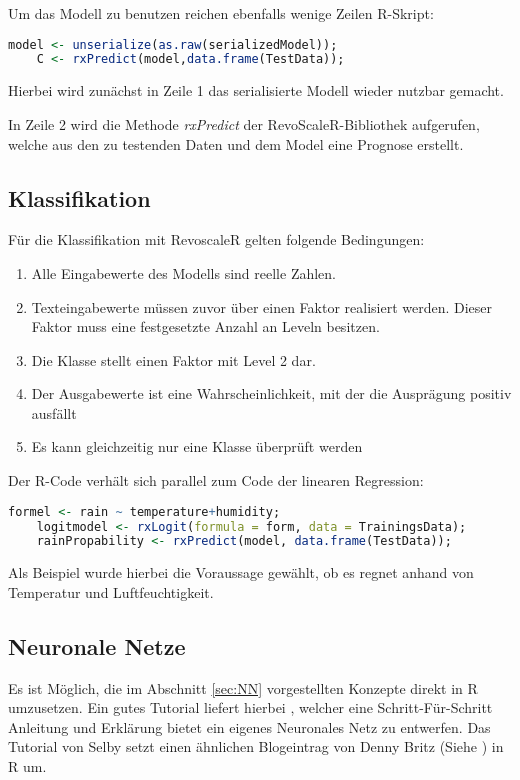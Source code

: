 Um das Modell zu benutzen reichen ebenfalls wenige Zeilen R-Skript: \newline

\begin{lstlisting}[language=R]
	model <- unserialize(as.raw(serializedModel)); 
	C <- rxPredict(model,data.frame(TestData));
\end{lstlisting}

Hierbei wird zunächst in Zeile 1 das serialisierte Modell wieder nutzbar gemacht. 

In Zeile 2 wird die Methode \textit{rxPredict} der RevoScaleR-Bibliothek aufgerufen, welche aus den zu testenden Daten und dem Model eine Prognose erstellt. 
\subsection{Klassifikation}
Für die Klassifikation mit RevoscaleR gelten folgende Bedingungen: ~\newline

\begin{enumerate}
	\item Alle Eingabewerte des Modells sind reelle Zahlen.
	\item Texteingabewerte müssen zuvor über einen Faktor realisiert werden. Dieser Faktor muss eine festgesetzte Anzahl an Leveln besitzen.
	\item Die Klasse stellt einen Faktor mit Level 2 dar.
	\item Der Ausgabewerte ist eine Wahrscheinlichkeit, mit der die Ausprägung positiv ausfällt
	\item Es kann gleichzeitig nur eine Klasse überprüft werden
\end{enumerate}

Der R-Code verhält sich parallel zum Code der linearen Regression:

\begin{lstlisting}[language=R]
	formel <- rain ~ temperature+humidity;
	logitmodel <- rxLogit(formula = form, data = TrainingsData);
	rainPropability <- rxPredict(model, data.frame(TestData));
\end{lstlisting}

Als Beispiel wurde hierbei die Voraussage gewählt, ob es regnet anhand von Temperatur und Luftfeuchtigkeit.
\subsection{Neuronale Netze}
Es ist Möglich, die im Abschnitt \ref{sec:NN} vorgestellten Konzepte direkt in R umzusetzen. Ein gutes Tutorial liefert hierbei \cite{SelbyNN}, welcher eine Schritt-Für-Schritt Anleitung und Erklärung bietet ein eigenes Neuronales Netz zu entwerfen. Das Tutorial von Selby setzt einen ähnlichen Blogeintrag von Denny Britz (Siehe \cite{DennyNN}) in R um. 

